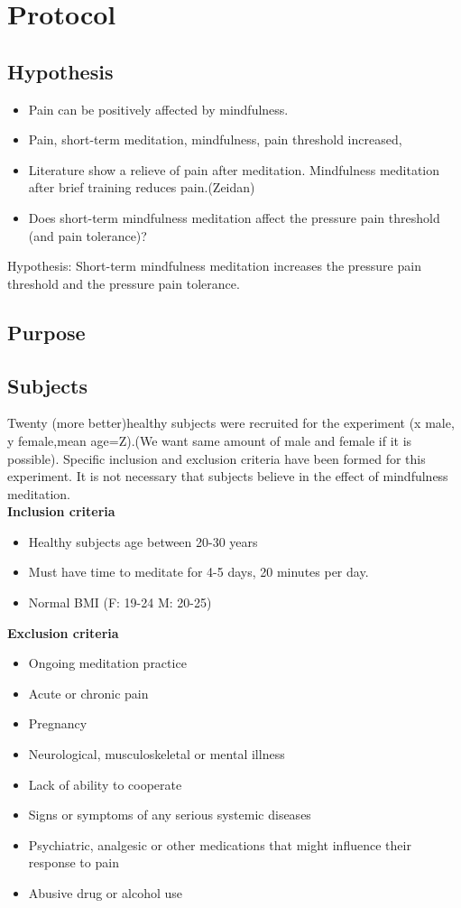 \section{Protocol}

\subsection{Hypothesis}
\begin{itemize}
	\item Pain can be positively affected by mindfulness.
	\item  Pain, short-term meditation, mindfulness, pain threshold increased,
	\item Literature show a relieve of pain after meditation. Mindfulness meditation after brief training reduces pain.(Zeidan)
	\item Does short-term mindfulness meditation affect the pressure pain threshold (and pain tolerance)?
\end{itemize}

Hypothesis: Short-term mindfulness meditation increases the pressure pain threshold and the pressure pain tolerance.
\subsection{Purpose}
\subsection{Subjects}
Twenty (more better)healthy subjects were recruited for the experiment (x male, y female,mean age=Z).(We want same amount of male and female if it is possible). Specific inclusion and exclusion criteria have been formed for this experiment. It is not necessary that subjects believe in the effect of mindfulness meditation. \\

\textbf{Inclusion criteria}

\begin{itemize}
	\item Healthy subjects age between 20-30 years
	\item Must have time to meditate for 4-5 days, 20 minutes per day.
	\item Normal BMI (F: 19-24 M: 20-25)
\end{itemize}

\textbf{Exclusion criteria}

\begin{itemize}
	\item Ongoing meditation practice 
	\item Acute or chronic pain
	\item Pregnancy 
	\item Neurological, musculoskeletal or mental illness
	\item Lack of ability to cooperate
	\item Signs or symptoms of any serious systemic diseases 
	\item Psychiatric, analgesic or other medications that might influence their response to pain 
	\item Abusive drug or alcohol use
	
\end{itemize}
